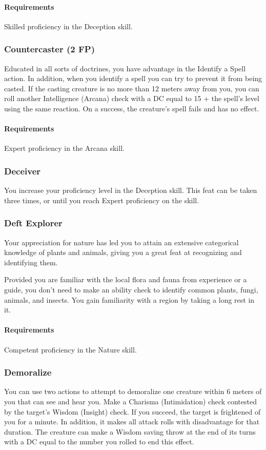     \paragraph{Requirements} Skilled proficiency in the Deception skill.
\subsubsection{Countercaster (2 FP)} \label{feat::countercaster}
    Educated in all sorts of doctrines, you have advantage in the Identify a Spell action.
    In addition, when you identify a spell you can try to prevent it from being casted.
    If the casting creature is no more than 12 meters away from you, you can roll another Intelligence (Arcana) check with a DC equal to 15 + the spell's level using the same reaction.
    On a success, the creature's spell fails and has no effect.
    \paragraph{Requirements} Expert proficiency in the Arcana skill.
\subsubsection{Deceiver} \label{feat::deceiver}
    You increase your proficiency level in the Deception skill.
    This feat can be taken three times, or until you reach Expert proficiency on the skill.
\subsubsection{Deft Explorer} \label{feat::deftexplorer}
    Your appreciation for nature has led you to attain an extensive categorical knowledge of plants and animals, giving you a great feat at recognizing and identifying them.

    Provided you are familiar with the local flora and fauna from experience or a guide, you don't need to make an ability check to identify common plants, fungi, animals, and insects.
    You gain familiarity with a region by taking a long rest in it.
    \paragraph{Requirements} Competent proficiency in the Nature skill.
\subsubsection{Demoralize} \label{feat::demoralize}
    You can use two actions to attempt to demoralize one creature within 6 meters of you that can see and hear you.
    Make a Charisma (Intimidation) check contested by the target's Wisdom (Insight) check.
    If you succeed, the target is frightened of you for a minute.
    In addition, it makes all attack rolls with disadvantage for that duration.
    The creature can make a Wisdom saving throw at the end of its turns with a DC equal to the number you rolled to end this effect.

